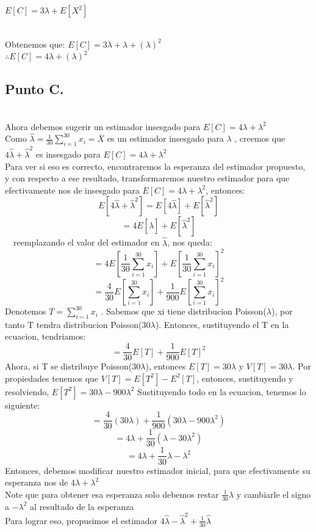 \documentclass[letterpaper,12pt,onecolumn,titlepage]{article}
\begin{document}
$E[C]=3\lambda + E[X^2]$

~\\Obtenemos que: 
$E[C]=3\lambda + \lambda + (\lambda)^2$
~\\$\therefore E[C] = 4\lambda + (\lambda)^2$

\subsection{Punto C.}
~\\ Ahora debemos sugerir un estimador insesgado para $E[C] = 4\lambda + {\lambda}^2$
~\\ Como $\hat{\lambda}= \frac{1}{30} \sum_{i=1}^{30}x_{i} = \overline{X}$ es un estimador insesgado para $\lambda$ , creemos que $4\hat{\lambda}+\hat{\lambda}^2$ es insesgado para $E[C] = 4\lambda + {\lambda}^2$
~\\ Para ver si eso es correcto, encontraremos la esperanza del estimador propuesto, y con respecto a ese resultado, transformaremos nuestro estimador para que efectivamente nos de insesgado para $E[C] = 4\lambda + {\lambda}^2$, entonces:
~\\ $$E[4\hat{\lambda}+\hat{\lambda}^2]=E[4\hat{\lambda}]+E[\hat{\lambda}^2]$$
 $$=4E[\hat{\lambda}]+E[\hat{\lambda}^2]$$
~\ reemplazando el valor del estimador en $\hat{\lambda}$, nos queda:
$$=4E[\frac{1}{30}\sum_{i=1}^{30}x_{i}]+E[ \frac{1}{30} \sum_{i=1}^{30}x_{i}]^2$$
$$=\frac{4}{30}E[\sum_{i=1}^{30}x_{i}]+\frac{1}{900}E[\sum_{i=1}^{30}x_{i}]^2$$ 
Denotemos $T=\sum_{i=1}^{30}x_{i}$ . Sabemos que xi tiene distribucion Poisson($\lambda$), por tanto T tendra distribucion Poisson($30\lambda$). Entonces, sustituyendo el T en la ecuacion, tendriamos:
$$=\frac{4}{30}E[T]+\frac{1}{900}E[T]^2$$
Ahora, si T se distribuye Poisson($30\lambda$), entonces $E[T]=30\lambda$ y $V[T]=30\lambda$.
Por propiedades tenemos que $V[T]=E[T^2]-E^2[T]$, entonces, sustituyendo y resolviendo, $E[T^2]=30\lambda-900{\lambda}^2$
Sustituyendo todo en la ecuacion, tenemos lo siguiente:
$$=\frac{4}{30}(30\lambda)+\frac{1}{900}(30\lambda-900{\lambda}^2)$$ 
$$=4\lambda+\frac{1}{30}(\lambda-30{\lambda}^2)$$
$$=4\lambda+\frac{1}{30}\lambda-{\lambda}^2$$
Entonces, debemos modificar nuestro estimador inicial, para que efectivamente su esperanza nos de $4\lambda + {\lambda}^2$
~\\ Note que para obtener esa esperanza solo debemos restar $\frac{1}{30}\lambda$ y cambiarle el signo a $-{\lambda}^2$ al resultado de la esperanza
~\\ Para lograr eso, propusimos el estimador $4\hat{\lambda}-\hat{\lambda}^2+\frac{1}{30}\hat{\lambda}$
\end{document}
